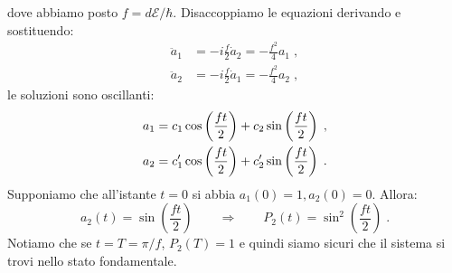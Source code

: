 \documentclass[12pt,a4paper]{report}
\theoremstyle{definition}
\numberwithin{equation}{section}
\begin{document}
dove abbiamo posto $f=d\mathcal{E}/\hbar$. Disaccoppiamo le equazioni derivando e sostituendo:
\begin{align*}
\ddot{a}_1 &= -i\frac{f}{2}\dot{a}_2=-\frac{f^2}{4}a_1\;, \\
\ddot{a}_2 &= -i\frac{f}{2}\dot{a}_1=-\frac{f^2}{4}a_2\;,
\end{align*}
le soluzioni sono oscillanti:
\begin{align}
a_1 &= c_1\cos\left(\frac{ft}{2}\right)+c_2\sin\left(\frac{ft}{2}\right)\;, \notag \\
a_2 &= c_1'\cos\left(\frac{ft}{2}\right)+c_2'\sin\left(\frac{ft}{2}\right)\;.
\end{align}
Supponiamo che all'istante $t=0$ si abbia $a_1(0)=1,a_2(0)=0$. Allora:
\begin{equation}
a_2(t)=\sin\left(\frac{ft}{2}\right)\qquad \Longrightarrow \qquad P_2(t)=\sin^2\left(\frac{ft}{2}\right)\;.
\end{equation}
Notiamo che se $t=T=\pi/f$, $P_2(T)=1$ e quindi siamo sicuri che il sistema si trovi nello stato fondamentale. \\
\end{document}
